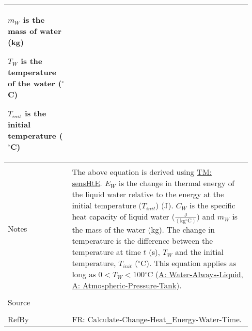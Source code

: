 \documentclass[12pt]{article}
\begin{document}
\begin{minipage}{\textwidth}
\begin{tabular}{p{} p{}}
\begin{symbDescription}
                                                                                           \item{${m_{W}}$ is the mass of water (kg)}
                                                                                           \item{${T_{W}}$ is the temperature of the water (${}^{\circ}$C)}
                                                                                           \item{${T_{init}}$ is the initial temperature (${}^{\circ}$C)}
                                                                                           \end{symbDescription}
                                                                                           \\ \midrule \\
                                                                                           Notes & The above equation is derived using \hyperref[TM:sensHtE]{TM: sensHtE}. ${E_{W}}$ is the change in thermal energy of the liquid water relative to the energy at the initial temperature (${T_{init}}$) (J). ${C_{W}}$ is the specific heat capacity of liquid water ($\frac{\text{J}}{(\text{kg}{}^{\circ}\text{C})}$) and ${m_{W}}$ is the mass of the water (kg). The change in temperature is the difference between the temperature at time $t$ (s), ${T_{W}}$ and the initial temperature, ${T_{init}}$ (${}^{\circ}$C). This equation applies as long as $0<{T_{W}}<100$${}^{\circ}$C (\hyperref[A:Water-Always-Liquid]{A: Water-Always-Liquid}, \hyperref[A:Atmospheric-Pressure-Tank]{A: Atmospheric-Pressure-Tank}).
                                                                                                   \\ \midrule \\
                                                                                                   Source & \cite{koothoor2013}
                                                                                                            \\ \midrule \\
                                                                                                            RefBy & \hyperref[reqCCHEWT]{FR: Calculate-Change-Heat\_Energy-Water-Time}.
\\ \bottomrule \end{tabular}
\end{minipage}\\
\end{document}
